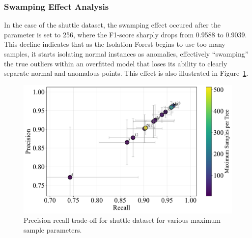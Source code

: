 \documentclass[10pt, conference]{IEEEtran}
\begin{document}
\subsubsection{Swamping Effect Analysis}
In the case of the shuttle dataset, the swamping effect occured after the parameter is set to 256, where the F1-score sharply drops from 0.9588 to 0.9039. This decline indicates that as the Isolation Forest begins to use too many samples, it starts isolating normal instances as anomalies, effectively “swamping” the true outliers within an overfitted model that loses its ability to clearly separate normal and anomalous points. This effect is also illustrated in Figure~\ref{fig:max_samples_shuttle}.

\begin{figure}[H]
	\centering
	\includegraphics[width=\linewidth]{../results/shuttle/max_samples/precision_recall_tradeoff.pdf}
	\caption{Precision recall trade-off for shuttle dataset for various maximum sample parameters.}
	\label{fig:max_samples_shuttle}
\end{figure}
\end{document}
